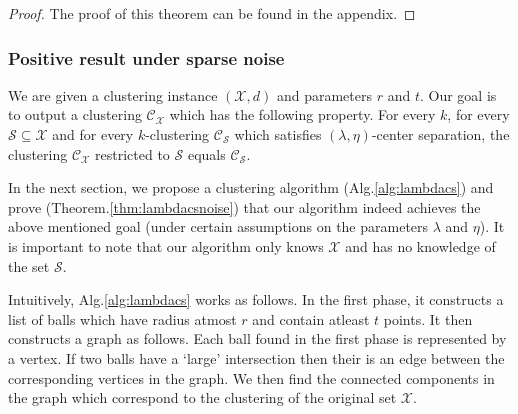 \documentclass[anon,12pt]{colt2016} %
\newcommand{\mc}{\mathcal}
\begin{document}
\begin{proof}
The proof of this theorem can be found in the appendix. 
\end{proof}


\subsubsection{Positive result under sparse noise}
\label{section:lambdaPositiveResultSparseNoise}
We are given a clustering instance $(\mc X, d)$ and parameters $r$ and $t$. Our goal is to output a clustering $\mc C_{\mc X}$ which has the following property. For every $k$, for every $\mc S \subseteq \mc X$ and for every $k$-clustering $\mc C_{\mc S}$ which satisfies $(\lambda, \eta)$-center separation, the clustering $\mc C_{\mc X}$ restricted to $\mc S$ equals $\mc C_{\mc S}$. 

In the next section, we propose a clustering algorithm (Alg.\ref{alg:lambdacs}) and prove (Theorem.\ref{thm:lambdacsnoise}) that our algorithm indeed achieves the above mentioned goal (under certain assumptions on the parameters $\lambda$ and $\eta$). It is important to note that our algorithm only knows $\mc X$ and has no knowledge of the set $\mc S$. 

Intuitively, Alg.\ref{alg:lambdacs} works as follows. In the first phase, it constructs a list of balls which have radius atmost $r$ and contain atleast $t$ points. It then constructs a graph as follows. Each ball found in the first phase is represented by a vertex. If two balls have a `large' intersection then their is an edge between the corresponding vertices in the graph. We then find the connected components in the graph which correspond to the clustering of the original set $\mc X$. 
\end{document}
